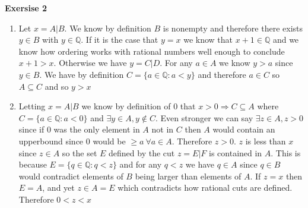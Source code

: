 \documentclass[12pt]{article}
\newcounter{ques}[section]
\newenvironment{ques}[1]{\textbf{Exersise #1} \vspace{1mm}}{\medskip}
\theoremstyle{definition}
\begin{document}
\begin{ques}{2}
\begin{enumerate}
		\item
			Let $x = A|B$. We know by definition $B$ is nonempty
			and therefore there exists $y \in B$ with $y \in
			\mathbb Q$. If it is the case that $y = x$ we know that
			$x + 1 \in \mathbb Q$ and we know how ordering works
			with rational numbers well enough to conclude $x +1 >
			x$. Otherwise we have $y = C|D$. For any $a \in  A$ we
			know $y > a$ since $y \in B$. We have by definition $C
			= \{a \in \mathbb Q: a < y\}$ and therefore $a \in C$
			so $A \subseteq C$ and so $y > x$
		\item
			Letting $x = A|B$ we know by definition of $0$ that $x
			> 0 \Rightarrow C \subseteq A$ where $C = \{a \in \mathbb
			Q: a < 0\}$ and $\exists y \in A, y\notin C$. Even
			stronger we can say $\exists z \in A, z > 0$ since if
			$0$ was the only element in $A$ not in $C$ then $A$
			would contain an upperbound since $0$ would be $\geq a \ 
			\forall a \in A$. Therefore $z > 0$. $z$ is less than
			$x$ since $z \in A$ so the set $E$ defined by the cut
			$z = E|F$ is contained in $A$. This is because $E = \{q
			\in \mathbb Q: q < z\}$ and for any $q < z$ we have $q \in A$
			since $q \in B$ would contradict elements of $B$ being
			larger than elements of $A$. If $z = x$ then $E = A$,
			and yet $z \in A = E$ which contradicts how rational
			cuts are defined. Therefore $0 < z < x$

	\end{enumerate}
\end{ques}
\end{document}
